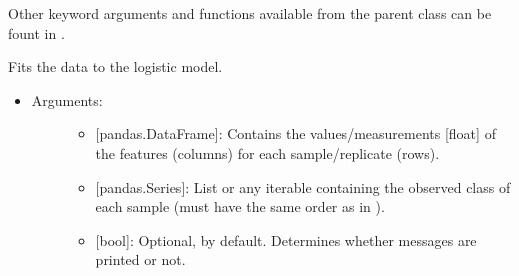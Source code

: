 \documentclass[letterpaper,10pt,english]{sphinxmanual}
\begin{document}
\begin{fulllineitems}
\begin{itemize}
\begin{description}
\begin{itemize}
\end{itemize}

Other keyword arguments and functions available from the parent
class  can be fount in .

\end{description}

\end{itemize}

\begin{fulllineitems}
\label{\detokenize{models:data_tools.models.Lasso.fit_data}}
Fits the data to the logistic model.
\begin{itemize}
\item {} \begin{description}
\item[{Arguments:}] \leavevmode\begin{itemize}
\item {} 
 {[}pandas.DataFrame{]}: Contains the values/measurements
{[}float{]} of the features (columns) for each
sample/replicate (rows).

\item {} 
 {[}pandas.Series{]}: List or any iterable containing the
observed class of each sample (must have the same order as
in ).

\item {} 
 {[}bool{]}: Optional,  by default.
Determines whether messages are printed or not.

\end{itemize}

\end{description}

\end{itemize}

\end{fulllineitems}



\end{fulllineitems}
\end{document}
